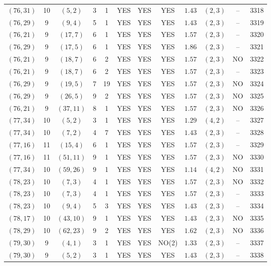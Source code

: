 \begin{longtable}{|c|c|c|c|c|c|c|c|c|c|c|c|}
$(76,31)$ & 10 & $(5,2)$ & 3 & 1 & YES & YES & YES & $1.43$ & $(2,3)$ & -- & 3318\\
$(76,29)$ & 9 & $(9,4)$ & 5 & 1 & YES & YES & YES & $1.43$ & $(2,3)$ & -- & 3319\\
$(76,21)$ & 9 & $(17,7)$ & 6 & 1 & YES & YES & YES & $1.57$ & $(2,3)$ & -- & 3320\\
$(76,29)$ & 9 & $(17,5)$ & 6 & 1 & YES & YES & YES & $1.86$ & $(2,3)$ & -- & 3321\\
$(76,21)$ & 9 & $(18,7)$ & 6 & 2 & YES & YES & YES & $1.57$ & $(2,3)$ & NO & 3322\\
$(76,21)$ & 9 & $(18,7)$ & 6 & 2 & YES & YES & YES & $1.57$ & $(2,3)$ & -- & 3323\\
$(76,29)$ & 9 & $(19,5)$ & 7 & 19 & YES & YES & YES & $1.57$ & $(2,3)$ & NO & 3324\\
$(76,29)$ & 9 & $(26,5)$ & 9 & 2 & YES & YES & YES & $1.57$ & $(2,3)$ & NO & 3325\\
$(76,21)$ & 9 & $(37,11)$ & 8 & 1 & YES & YES & YES & $1.57$ & $(2,3)$ & NO & 3326\\
$(77,34)$ & 10 & $(5,2)$ & 3 & 1 & YES & YES & YES & $1.29$ & $(4,2)$ & -- & 3327\\
$(77,34)$ & 10 & $(7,2)$ & 4 & 7 & YES & YES & YES & $1.43$ & $(2,3)$ & -- & 3328\\
$(77,16)$ & 11 & $(15,4)$ & 6 & 1 & YES & YES & YES & $1.57$ & $(2,3)$ & -- & 3329\\
$(77,16)$ & 11 & $(51,11)$ & 9 & 1 & YES & YES & YES & $1.57$ & $(2,3)$ & NO & 3330\\
$(77,34)$ & 10 & $(59,26)$ & 9 & 1 & YES & YES & YES & $1.14$ & $(4,2)$ & NO & 3331\\
$(78,23)$ & 10 & $(7,3)$ & 4 & 1 & YES & YES & YES & $1.57$ & $(2,3)$ & NO & 3332\\
$(78,23)$ & 10 & $(7,3)$ & 4 & 1 & YES & YES & YES & $1.57$ & $(2,3)$ & -- & 3333\\
$(78,23)$ & 10 & $(9,4)$ & 5 & 3 & YES & YES & YES & $1.43$ & $(2,3)$ & -- & 3334\\
$(78,17)$ & 10 & $(43,10)$ & 9 & 1 & YES & YES & YES & $1.43$ & $(2,3)$ & NO & 3335\\
$(78,29)$ & 10 & $(62,23)$ & 9 & 2 & YES & YES & YES & $1.62$ & $(2,3)$ & NO & 3336\\
$(79,30)$ & 9 & $(4,1)$ & 3 & 1 & YES & YES & NO(2) & $1.33$ & $(2,3)$ & -- & 3337\\
$(79,30)$ & 9 & $(5,2)$ & 3 & 1 & YES & YES & YES & $1.43$ & $(2,3)$ & -- & 3338\\

\end{longtable}
